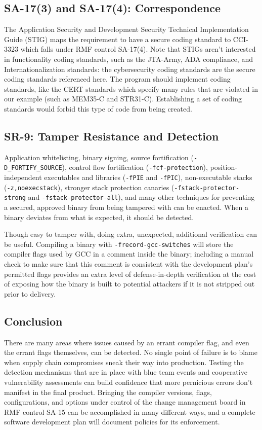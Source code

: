\subsection*{SA-17(3) and SA-17(4): Correspondence}
The Application Security and Development Security Technical Implementation Guide (STIG) maps the requirement to have a secure coding standard to CCI-3323 which falls under RMF control SA-17(4). Note that STIGs aren't interested in functionality coding standards, such as the JTA-Army, ADA compliance, and Internationalization standards: the cybersecurity coding standards are the secure coding standards referenced here. The program should implement coding standards, like the CERT standards which specify many rules that are violated in our example (such as MEM35-C and STR31-C). Establishing a set of coding standards would forbid this type of code from being created.

\subsection*{SR-9: Tamper Resistance and Detection}
Application whitelisting, binary signing, source fortification (\texttt{-D\_FORTIFY\_SOURCE}), control flow fortification (\texttt{-fcf-protection}), position-independent executables and libraries (\texttt{-fPIE} and \texttt{-fPIC}), non-executable stacks (\texttt{-z,noexecstack}), stronger stack protection canaries (\texttt{-fstack-protector-strong} and \texttt{-fstack-protector-all}), and many other techniques for preventing a secured, approved binary from being tampered with can be enacted. When a binary deviates from what is expected, it should be detected.

Though easy to tamper with, doing extra, unexpected, additional verification can be useful. Compiling a binary with \texttt{-frecord-gcc-switches} will store the compiler flags used by GCC in a comment inside the binary; including a manual check to make sure that this comment is consistent with the development plan's permitted flags provides an extra level of defense-in-depth verification at the cost of exposing how the binary is built to potential attackers if it is not stripped out prior to delivery.

\subsection*{Conclusion}
There are many areas where issues caused by an errant compiler flag, and even the errant flags themselves, can be detected. No single point of failure is to blame when supply chain compromises sneak their way into production. Testing the detection mechanisms that are in place with blue team events and cooperative vulnerability assessments can build confidence that more pernicious errors don't manifest in the final product. Bringing the compiler versions, flags, configurations, and options under control of the change management board in RMF control SA-15 can be accomplished in many different ways, and a complete software development plan will document policies for its enforcement.